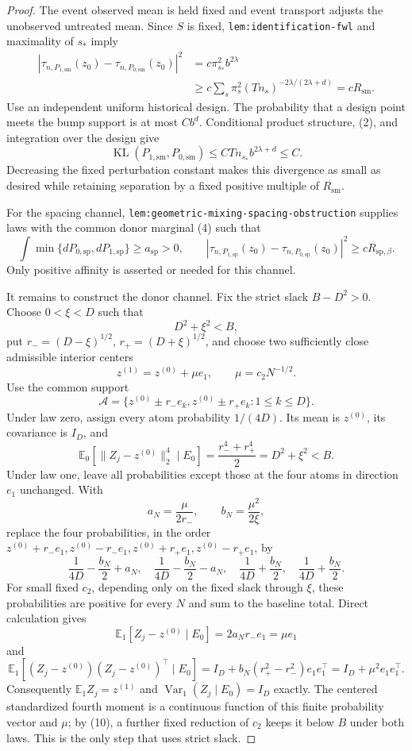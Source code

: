 \documentclass{article}
\begin{document}
\begin{proof}
The event observed mean is held fixed and event transport adjusts the unobserved untreated mean.  Since \(S\) is fixed, \texttt{lem:identification-fwl} and maximality of \(s_*\) imply
\[
\begin{aligned}
\left|\tau_{n,P_{1,\mathrm{sm}}}(z_0)-
\tau_{n,P_{0,\mathrm{sm}}}(z_0)\right|^2
&=c\pi_{s_*}^2b^{2\lambda}\\
&\geq c\sum_s\pi_s^2(Tn_s)^{-2\lambda/(2\lambda+d)}
=cR_{\mathrm{sm}}.
\end{aligned}
\tag{7}
\]
Use an independent uniform historical design.  The probability that a design point meets the bump support is at most \(Cb^d\).  Conditional product structure, (2), and integration over the design give
\[
\operatorname{KL}(P_{1,\mathrm{sm}},P_{0,\mathrm{sm}})
\leq CTn_{s_*}b^{2\lambda+d}\leq C.
\tag{8}
\]
Decreasing the fixed perturbation constant makes this divergence as small as desired while retaining separation by a fixed positive multiple of \(R_{\mathrm{sm}}\).

For the spacing channel, \texttt{lem:geometric-mixing-spacing-obstruction} supplies laws with the common donor marginal (4) such that
\[
\int\min\{dP_{0,\mathrm{sp}},dP_{1,\mathrm{sp}}\}
\geq a_{\mathrm{sp}}>0,
\qquad
\left|\tau_{n,P_{1,\mathrm{sp}}}(z_0)-
\tau_{n,P_{0,\mathrm{sp}}}(z_0)\right|^2
\geq cR_{\mathrm{sp},\beta}.
\tag{9}
\]
Only positive affinity is asserted or needed for this channel.

It remains to construct the donor channel.  Fix the strict slack \(B-D^2>0\).  Choose \(0<\xi<D\) such that
\[
D^2+\xi^2<B,
\]
put \(r_-=(D-\xi)^{1/2}\), \(r_+=(D+\xi)^{1/2}\), and choose two sufficiently close admissible interior centers
\[
z^{(1)}=z^{(0)}+\mu e_1,
\qquad
\mu=c_2N^{-1/2}.
\]
Use the common support
\[
\mathcal A=\{z^{(0)}\pm r_-e_k, z^{(0)}\pm r_+e_k:1\leq k\leq D\}.
\]
Under law zero, assign every atom probability \(1/(4D)\).  Its mean is \(z^{(0)}\), its covariance is \(I_D\), and
\[
\mathbb E_0[\|Z_j-z^{(0)}\|_2^4\mid E_0]
=\frac{r_-^4+r_+^4}{2}=D^2+\xi^2<B.
\tag{10}
\]
Under law one, leave all probabilities except those at the four atoms in direction \(e_1\) unchanged.  With
\[
a_N=\frac{\mu}{2r_-},
\qquad
b_N=\frac{\mu^2}{2\xi},
\]
replace the four probabilities, in the order
\(z^{(0)}+r_-e_1,z^{(0)}-r_-e_1,z^{(0)}+r_+e_1,z^{(0)}-r_+e_1\), by
\[
\frac1{4D}-\frac{b_N}{2}+a_N,
\quad
\frac1{4D}-\frac{b_N}{2}-a_N,
\quad
\frac1{4D}+\frac{b_N}{2},
\quad
\frac1{4D}+\frac{b_N}{2}.
\tag{11}
\]
For small fixed \(c_2\), depending only on the fixed slack through \(\xi\), these probabilities are positive for every \(N\) and sum to the baseline total.  Direct calculation gives
\[
\mathbb E_1[Z_j-z^{(0)}\mid E_0]=2a_Nr_-e_1=\mu e_1
\]
and
\[
\mathbb E_1[(Z_j-z^{(0)})(Z_j-z^{(0)})^\top\mid E_0]
=I_D+b_N(r_+^2-r_-^2)e_1e_1^\top
=I_D+\mu^2e_1e_1^\top.
\]
Consequently \(\mathbb E_1Z_j=z^{(1)}\) and
\(\operatorname{Var}_1(Z_j\mid E_0)=I_D\) exactly.  The centered standardized fourth moment is a continuous function of this finite probability vector and \(\mu\); by (10), a further fixed reduction of \(c_2\) keeps it below \(B\) under both laws.  This is the only step that uses strict slack.


\end{proof}
\end{document}
